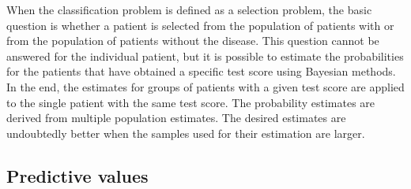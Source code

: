 \documentclass[
  nojss]{jss}
\begin{document}
When the classification problem is defined as a selection problem, the
basic question is whether a patient is selected from the population of
patients with or from the population of patients without the disease.
This question cannot be answered for the individual patient, but it is
possible to estimate the probabilities for the patients that have
obtained a specific test score using Bayesian methods. In the end, the
estimates for groups of patients with a given test score are applied to
the single patient with the same test score. The probability estimates
are derived from multiple population estimates. The desired estimates
are undoubtedly better when the samples used for their estimation are
larger.

\hypertarget{predictive-values}{%
\subsection{Predictive values}\label{predictive-values}}
\end{document}
